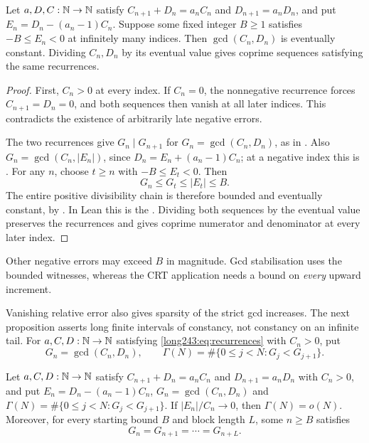 \documentclass[11pt]{article}
\begin{document}
\begin{proposition}\label{long243:res:gcdstab}
Let $a,D,C:\mathbb{N}\to\mathbb{N}$ satisfy $C_{n+1}+D_n=a_nC_n$ and
$D_{n+1}=a_nD_n$, and put $E_n=D_n-(a_n-1)C_n$. Suppose some fixed integer $B\ge1$ satisfies
$-B\le E_n<0$ at infinitely many indices. Then
$\gcd(C_n,D_n)$ is eventually constant. Dividing $C_n,D_n$ by its
eventual value gives coprime sequences satisfying the same recurrences.
\end{proposition}

\begin{proof}
First, $C_n>0$ at every index. If $C_n=0$, the nonnegative recurrence
forces $C_{n+1}=D_n=0$, and both sequences then vanish at all later
indices. This contradicts the existence of arbitrarily late negative
errors.

The two recurrences give $G_n\mid G_{n+1}$ for
$G_n=\gcd(C_n,D_n)$, as in
.
Also $G_n=\gcd(C_n,|E_n|)$, since $D_n=E_n+(a_n-1)C_n$;
at a negative index this is
.
For any $n$, choose $t\ge n$ with $-B\le E_t<0$. Then
\[
 G_n\le G_t\le |E_t|\le B.
\]
The entire positive divisibility chain is therefore bounded and eventually
constant, by
.
In Lean this is the
.
Dividing both sequences by the eventual value preserves the recurrences
and gives coprime numerator and denominator at every later index.
\end{proof}

Other negative errors may exceed $B$ in magnitude. Gcd stabilisation
uses the bounded witnesses, whereas the CRT application needs a bound
on \emph{every} upward increment.

Vanishing relative error also gives sparsity of the strict gcd increases.
The next proposition asserts long finite intervals of constancy, not
constancy on an infinite tail.
For $a,C,D:\mathbb{N}\to\mathbb{N}$ satisfying \eqref{long243:eq:recurrences} with $C_n>0$, put
\[
 G_n=\gcd(C_n,D_n),\qquad
 \Gamma(N)=\#\{0\le j<N:G_j<G_{j+1}\}.
\]

\begin{proposition}
\label{long243:res:gcdsparse}
Let $a,C,D:\mathbb{N}\to\mathbb{N}$ satisfy $C_{n+1}+D_n=a_nC_n$ and $D_{n+1}=a_nD_n$ with
$C_n>0$, and put $E_n=D_n-(a_n-1)C_n$, $G_n=\gcd(C_n,D_n)$ and
$\Gamma(N)=\#\{0\le j<N:G_j<G_{j+1}\}$.  If $|E_n|/C_n\to0$, then
$\Gamma(N)=o(N)$.  Moreover, for every starting bound $B$ and block length
$L$, some $n\ge B$ satisfies
\[
  G_n=G_{n+1}=\cdots=G_{n+L}.
\]
\end{proposition}
\end{document}
